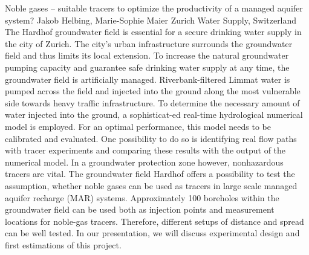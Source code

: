 \begin{conf-abstract}
{Noble gases -- suitable tracers to optimize the productivity of a managed aquifer system?}
{Jakob Helbing, Marie-Sophie Maier}
{Zurich Water Supply, Switzerland}
{The Hardhof groundwater field is essential for a secure drinking water supply in the city of Zurich. The city's urban infrastructure surrounds the groundwater field and thus limits its local extension. To increase the natural groundwater pumping capacity and guarantee safe drinking water supply at any time, the groundwater field is artificially managed. Riverbank-filtered Limmat water is pumped across the field and injected into the ground along the most vulnerable side towards heavy traffic infrastructure. To determine the necessary amount of water injected into the ground, a sophisticat-ed real-time hydrological numerical model is employed. For an optimal performance, this model needs to be calibrated and evaluated. One possibility to do so is identifying real flow paths with tracer experiments and comparing these results with the output of the numerical model. In a groundwater protection zone however, nonhazardous tracers are vital. The groundwater field Hardhof offers a possibility to test the assumption, whether noble gases can be used as tracers in large scale managed aquifer recharge (MAR) systems. Approximately 100 boreholes within the groundwater field can be used both as injection points and measurement locations for noble-gas tracers. Therefore, different setups of distance and spread can be well tested. In our presentation, we will discuss experimental design and first estimations of this project.}
\end{conf-abstract}




